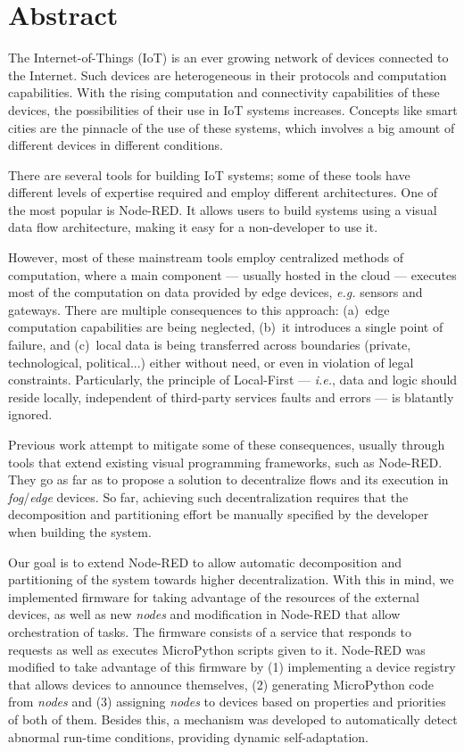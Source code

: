 \chapter*{Abstract}

The Internet-of-Things (IoT) is an ever growing network of devices connected to the Internet. Such devices are heterogeneous in their protocols and computation capabilities. With the rising computation and connectivity capabilities of these devices, the possibilities of their use in IoT systems increases. Concepts like smart cities are the pinnacle of the use of these systems, which involves a big amount of different devices in different conditions.

There are several tools for building IoT systems; some of these tools have different levels of expertise required and employ different architectures. One of the most popular is Node-RED. It allows users to build systems using a visual data flow architecture, making it easy for a non-developer to use it.

However, most of these mainstream tools employ centralized methods of computation, where a main component --- usually hosted in the cloud --- executes most of the computation on data provided by edge devices, \emph{e.g.} sensors and gateways. There are multiple consequences to this approach: (a)~edge computation capabilities are being neglected, (b)~it introduces a single point of failure, and (c)~local data is being transferred across boundaries (private, technological, political...) either without need, or even in violation of legal constraints. Particularly, the principle of Local-First --- \emph{i.e.}, data and logic should reside locally, independent of third-party services faults and errors --- is blatantly ignored.

Previous work attempt to mitigate some of these consequences, usually through tools that extend existing visual programming frameworks, such as Node-RED. They go as far as to propose a solution to decentralize flows and its execution in \textit{fog}/\textit{edge} devices. So far, achieving such decentralization requires that the decomposition and partitioning effort be manually specified by the developer when building the system.

Our goal is to extend Node-RED to allow automatic decomposition and partitioning of the system towards higher decentralization. With this in mind, we implemented firmware for taking advantage of the resources of the external devices, as well as new \textit{nodes} and modification in Node-RED that allow orchestration of tasks. The firmware consists of a service that responds to requests as well as executes MicroPython scripts given to it. Node-RED was modified to take advantage of this firmware by (1) implementing a device registry that allows devices to announce themselves, (2) generating MicroPython code from \textit{nodes} and (3) assigning \textit{nodes} to devices based on properties and priorities of both of them. Besides this, a mechanism was developed to automatically detect abnormal run-time conditions, providing dynamic self-adaptation.

